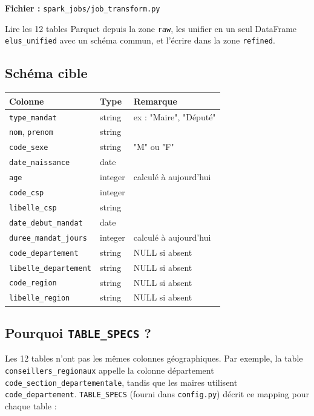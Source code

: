 \documentclass[11pt,a4paper]{article}
\begin{document}
\textbf{Fichier :} \texttt{spark\_jobs/job\_transform.py}

\begin{objectif}
Lire les 12 tables Parquet depuis la zone \texttt{raw}, les unifier en un seul DataFrame \texttt{elus\_unified} avec un schéma commun, et l'écrire dans la zone \texttt{refined}.
\end{objectif}

\subsection*{Schéma cible}

\begin{center}
\begin{tabular}{lll}
  \toprule
  \textbf{Colonne} & \textbf{Type} & \textbf{Remarque} \\
  \midrule
  \texttt{type\_mandat}         & string  & ex : "Maire", "Député" \\
  \texttt{nom}, \texttt{prenom} & string  & \\
  \texttt{code\_sexe}           & string  & "M" ou "F" \\
  \texttt{date\_naissance}      & date    & \\
  \texttt{age}                  & integer & calculé à aujourd'hui \\
  \texttt{code\_csp}            & integer & \\
  \texttt{libelle\_csp}         & string  & \\
  \texttt{date\_debut\_mandat}  & date    & \\
  \texttt{duree\_mandat\_jours} & integer & calculé à aujourd'hui \\
  \texttt{code\_departement}    & string  & NULL si absent \\
  \texttt{libelle\_departement} & string  & NULL si absent \\
  \texttt{code\_region}         & string  & NULL si absent \\
  \texttt{libelle\_region}      & string  & NULL si absent \\
  \bottomrule
\end{tabular}
\end{center}

\subsection*{Pourquoi \texttt{TABLE\_SPECS} ?}

Les 12 tables n'ont pas les mêmes colonnes géographiques. Par exemple, la table \texttt{conseillers\_regionaux} appelle la colonne département \texttt{code\_section\_departementale}, tandis que les maires utilisent \texttt{code\_departement}. \texttt{TABLE\_SPECS} (fourni dans \texttt{config.py}) décrit ce mapping pour chaque table :
\end{document}
